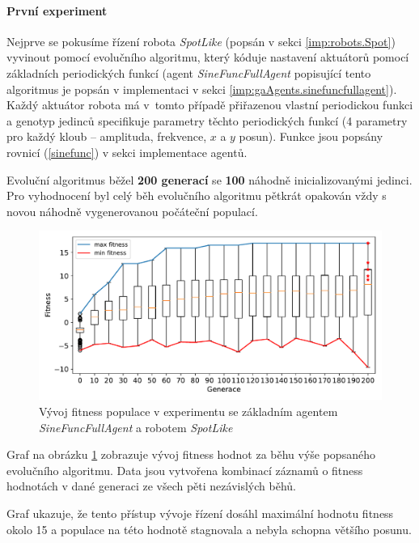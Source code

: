 \paragraph{První experiment}
Nejprve se pokusíme řízení robota \emph{SpotLike} (popsán v sekci
\ref{imp:robots.Spot}) vyvinout pomocí evolučního algoritmu, který kóduje
nastavení aktuátorů pomocí základních periodických funkcí (agent
\emph{SineFuncFullAgent} popisující tento algoritmus je popsán v implementaci v
sekci \ref{imp:gaAgents.sinefuncfullagent}). Každý aktuátor robota má v~tomto
případě přiřazenou vlastní periodickou funkci a genotyp jedinců specifikuje
parametry těchto periodických funkcí (4 parametry pro každý kloub -- amplituda,
frekvence, $x$ a $y$ posun). Funkce jsou popsány rovnicí (\ref{sinefunc}) v
sekci implementace agentů.

Evoluční algoritmus běžel \textbf{200 generací} se \textbf{100} náhodně
inicializovanými jedinci. Pro vyhodnocení byl celý běh evolučního algoritmu
pětkrát opakován vždy s novou náhodně vygenerovanou počáteční populací.

\begin{figure}[!h]
    \centering
    \includegraphics[width=1\textwidth]{../img/experiment1_Sine_10ticks.pdf}
    \caption{Vývoj fitness populace v experimentu se základním agentem\\
    \emph{SineFuncFullAgent} a robotem \emph{SpotLike}}
    \label{exp:first_sinefull}
\end{figure}

Graf na obrázku \ref{exp:first_sinefull} zobrazuje vývoj fitness
hodnot za běhu výše popsaného evolučního algoritmu. Data jsou vytvořena
kombinací záznamů o fitness hodnotách v dané generaci ze všech pěti nezávislých
běhů.

Graf ukazuje, že tento přístup vývoje řízení dosáhl maximální hodnotu fitness
okolo 15 a populace na této hodnotě stagnovala a nebyla schopna většího posunu.

